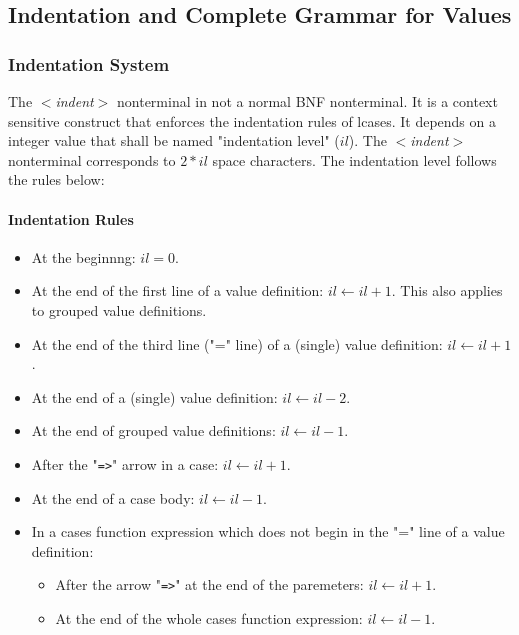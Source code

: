 \documentclass{article}
\begin{document}
\subsection{Indentation and Complete Grammar for Values}

\subsubsection{Indentation System}
\label{subsubsec:indsys}

The \textit{$<$indent$>$} nonterminal in not a normal BNF nonterminal. It is a
context sensitive construct that enforces the indentation rules of lcases.
It depends on a integer value that shall be named "indentation level" ($il$).
The \textit{$<$indent$>$} nonterminal corresponds to $2*il$ space characters.
The indentation level follows the rules below:

\paragraph{Indentation Rules}
\begin{itemize}

\item
At the beginnng: $il = 0$.

\item
At the end of the first line of a value definition: $il \leftarrow il + 1$.
This also applies to grouped value definitions.

\item
At the end of the third line ("=" line) of a (single) value definition: $il
\leftarrow il + 1$.

\item
At the end of a (single) value definition: $il \leftarrow il - 2$.

\item
At the end of grouped value definitions: $il \leftarrow il - 1$.

\item
After the "\texttt{=>}" arrow in a case: $il \leftarrow il + 1$.

\item
At the end of a case body: $il \leftarrow il - 1$.

\item
In a cases function expression which does not begin in the "=" line of a value
definition:
  \begin{itemize}

  \item
  After the arrow "\texttt{=>}" at the end of the paremeters: $il \leftarrow il + 1$.

  \item
  At the end of the whole cases function expression: $il \leftarrow il - 1$.

  \end{itemize}

\end{itemize}
\end{document}
